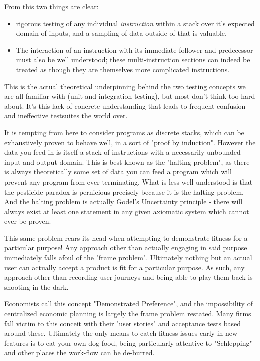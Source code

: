 \documentclass{article}
\begin{document}
From this two things are clear:
\begin{itemize}
\item rigorous testing of any individual \textit{instruction} within a stack over it's expected domain of inputs, and a sampling of data outside of that is valuable.
\item The interaction of an instruction with its immediate follower and predecessor must also be well understood; these multi-instruction sections can indeed be treated as though they are themselves more complicated instructions.
\end{itemize}
This is the actual theoretical underpinning behind the two testing concepts we are all familiar with (unit and integration testing), but most don't think too hard about.
It's this lack of concrete understanding that leads to frequent confusion and ineffective testsuites the world over.

It is tempting from here to consider programs as discrete stacks, which can be exhaustively proven to behave well, in a sort of "proof by induction".
However the data you feed in is itself a stack of instructions with a necessarily unbounded input and output domain.
This is best known as the "halting problem", as there is always theoretically some set of data you can feed a program which will prevent any program from ever terminating.
What is less well understood is that the pesticide paradox is pernicious precisely because it is the halting problem.
And the halting problem is actually Godel's Uncertainty principle - there will always exist at least one statement in any given axiomatic system which cannot ever be proven.

This same problem rears its head when attempting to demonstrate fitness for a particular purpose!
Any approach other than actually engaging in said purpose immediately falls afoul of the "frame problem".
Ultimately nothing but an actual user can actually accept a product is fit for a particular purpose.
As such, any approach other than recording user journeys and being able to play them back is shooting in the dark.

Economists call this concept "Demonstrated Preference", and the impossibility of centralized economic planning is largely the frame problem restated.
Many firms fall victim to this conceit with their "user stories" and acceptance tests based around these.
Ultimately the only means to catch fitness issues early in new features is to eat your own dog food, being particularly attentive to "Schlepping" and other places the work-flow can be de-burred.
\end{document}
